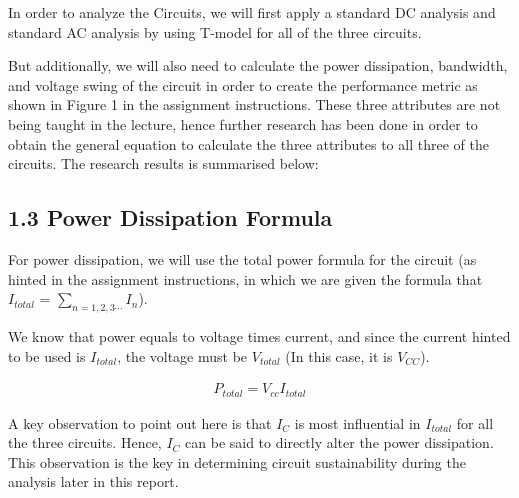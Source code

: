 \documentclass[11pt, a4paper]{article}
\begin{document}
\newpage
In order to analyze the Circuits, we will first apply a standard DC analysis and standard AC analysis by using T-model for all of the three circuits. 

But additionally, we will also need to calculate the power dissipation, bandwidth, and voltage swing of the circuit in order to create the performance metric as shown in Figure 1 in the assignment instructions. These three attributes are not being taught in the lecture, hence further research has been done in order to obtain the general equation to calculate the three attributes to all three of the circuits. The research results is summarised below:


\subsection*{1.3 Power Dissipation Formula}
For power dissipation, we will use the total power formula for the circuit (as hinted in the assignment instructions, in which we are given the formula that $I_{total}$ = $\sum_{n=1,2,3 \cdots} I_n$). 

We know that power equals to voltage times current, and since the current hinted to be used is $I_{total}$, the voltage must be $V_{total}$ (In this case, it is $V_{CC}$). 

\begin{align*}
    \boxed{P_{total} = V_{cc} I_{total}}
\end{align*}

A key observation to point out here is that $I_C$ is most influential in $I_{total}$ for all the three circuits. Hence, $I_C$ can be said to directly alter the power dissipation. This observation is the key in determining circuit sustainability during the analysis later in this report.
\end{document}
